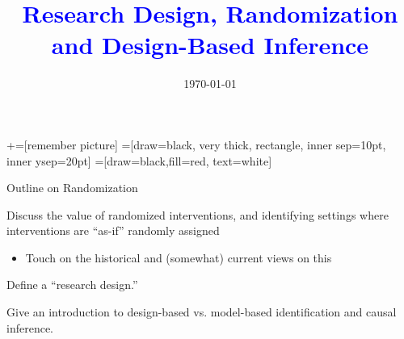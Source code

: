 \documentclass[notes,11pt, aspectratio=169]{beamer}
\title[]{\textcolor{blue}{Research Design, Randomization and Design-Based Inference }}
\author[PGP]{}
\institute[FRBNY]{\small{Paul Goldsmith-Pinkham}}
\date{\today}
\newenvironment{wideitemize}{\itemize\addtolength{\itemsep}{10pt}}{\enditemize}
\begin{document}
\newcommand\marktopleft[1]{%
    \tikz[overlay,remember picture] 
        \node (marker-#1-a) at (-.3em,.3em) {};%
}
\newcommand\markbottomright[2]{%
    \tikz[overlay,remember picture] 
        \node (marker-#1-b) at (0em,0em) {};%
}
+=[remember picture] 
 =[draw=black, very thick, rectangle, inner sep=10pt, inner ysep=20pt]
 =[draw=black,fill=red, text=white]

\begin{frame}
\maketitle

\end{frame}

\begin{frame}{Outline on Randomization}
  \begin{wideitemize}
    \item Discuss the value of randomized interventions, and identifying settings where interventions are ``as-if'' randomly assigned
   \begin{itemize}
     \item Touch on the historical and (somewhat) current views on this
    \end{itemize}
  \item Define a ``research design.''
  \item Give an introduction to design-based vs. model-based identification and causal inference.
\end{wideitemize}
\end{frame}
\end{document}
